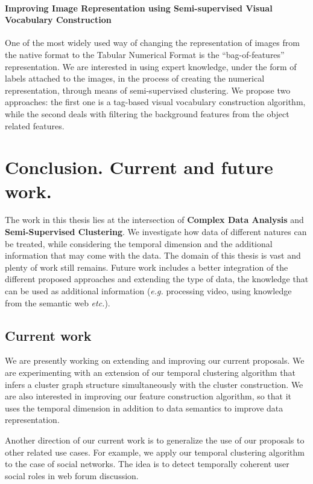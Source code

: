 \documentclass{article}
\begin{document}
\paragraph{Improving Image Representation using Semi-supervised Visual Vocabulary Construction}
One of the most widely used way of changing the representation of images from the native format to the Tabular Numerical Format is the ``bag-of-features''  representation.
We are interested in using expert knowledge, under the form of labels attached to the images, in the process of creating the numerical representation, through means of semi-supervised clustering.   
We propose two approaches: the first one is a tag-based visual vocabulary construction algorithm, while the second deals with filtering the background features from the object related features.

\section{Conclusion. Current and future work.}

The work in this thesis lies at the intersection of \textbf{Complex Data Analysis} and \textbf{Semi-Supervised Clustering}.
We investigate how data of different natures can be treated, while considering the temporal dimension and the additional information that may come with the data.
The domain of this thesis is vast and plenty of work still remains.
Future work includes a better integration of the different proposed approaches and extending the type of data, the knowledge that can be used as additional information (\textit{e.g.} processing video, using knowledge from the semantic web \textit{etc.}).

\subsection{Current work}

We are presently working on extending and improving our current proposals.
We are experimenting with an extension of our temporal clustering algorithm that infers a cluster graph structure simultaneously with the cluster construction.
We are also interested in improving our feature construction algorithm, so that it uses the temporal dimension in addition to data semantics to improve data representation.

Another direction of our current work is to generalize the use of our proposals to other related use cases.
For example, we apply our temporal clustering algorithm to the case of social networks.
The idea is to detect temporally coherent user social roles in web forum discussion.
\end{document}
